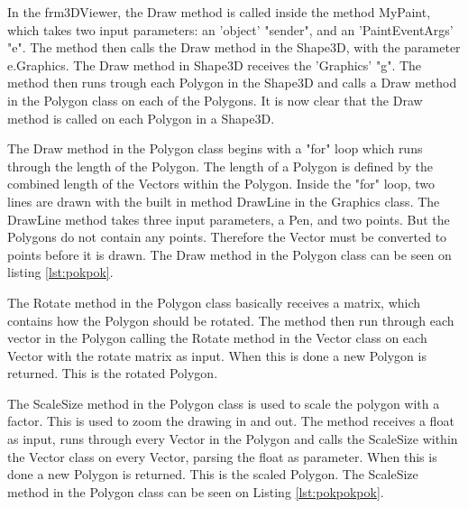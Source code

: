 In the frm3DViewer, the Draw method is called inside the method MyPaint, which takes two input parameters: an 'object' "sender", and an 'PaintEventArgs' "e". The method then calls the Draw method in the Shape3D, with the parameter e.Graphics. The Draw method in Shape3D receives the 'Graphics' "g". The method then runs trough each Polygon in the Shape3D and calls a Draw method in the Polygon class on each of the Polygons. It is now clear that the Draw method is called on each Polygon in a Shape3D.

The Draw method in the Polygon class begins with a "for" loop which runs through the length of the Polygon. The length of a Polygon is defined by the combined length of the Vectors within the Polygon. Inside the "for" loop, two lines are drawn with the built in method DrawLine in the Graphics class. The DrawLine method takes three input parameters, a Pen, and two points. But the Polygons do not contain any points. Therefore the Vector must be converted to points before it is drawn. The Draw method in the Polygon class can be seen on listing \ref{lst:pokpok}.

The Rotate method in the Polygon class basically receives a matrix, which contains how the Polygon should be rotated. The method then run through each vector in the Polygon calling the Rotate method in the Vector class on each Vector with the rotate matrix as input. When this is done a new Polygon is returned. This is the rotated Polygon.

The ScaleSize method in the Polygon class is used to scale the polygon with a factor. This is used to zoom the drawing in and out. The method receives a float as input, runs through every Vector in the Polygon and calls the ScaleSize within the Vector class on every Vector, parsing the float as parameter.  When this is done a new Polygon is returned. This is the scaled Polygon. The ScaleSize method in the Polygon class can be seen on Listing \ref{lst:pokpokpok}.

